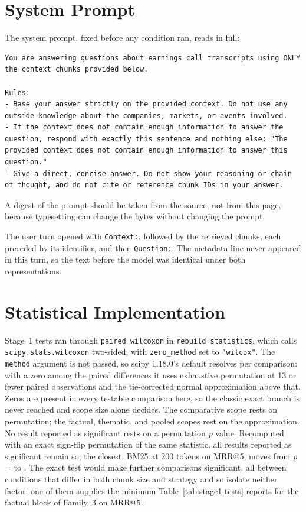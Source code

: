 \section{System Prompt}

The system prompt, fixed before any condition ran, reads in full:

\begin{lstlisting}[breaklines=true]
You are answering questions about earnings call transcripts using ONLY the context chunks provided below.

Rules:
- Base your answer strictly on the provided context. Do not use any outside knowledge about the companies, markets, or events involved.
- If the context does not contain enough information to answer the question, respond with exactly this sentence and nothing else: "The provided context does not contain enough information to answer this question."
- Give a direct, concise answer. Do not show your reasoning or chain of thought, and do not cite or reference chunk IDs in your answer.
\end{lstlisting}

A digest of the prompt should be taken from the source, not from this page,
because typesetting can change the bytes without changing the prompt.

The user turn opened with \texttt{Context:}, followed by the retrieved chunks,
each preceded by its identifier, and then \texttt{Question:}. The metadata line
never appeared in this turn, so the text before the model was identical under
both representations.

\section{Statistical Implementation}

Stage~1 tests ran through \texttt{paired\_wilcoxon} in
\texttt{rebuild\_statistics}, which calls
\texttt{scipy.stats.\allowbreak{}wilcoxon} two-sided, with
\texttt{zero\_method} set to \texttt{"wilcox"}. The
\texttt{method} argument is not passed, so scipy 1.18.0's default resolves per
comparison: with a zero among the paired differences it uses exhaustive
permutation at 13 or fewer paired observations and the tie-corrected normal
approximation above that. Zeros are present in every testable comparison here,
so the classic exact branch is never reached and scope size alone decides. The
comparative scope rests on permutation; the factual, thematic, and pooled scopes
rest on the approximation. No result reported as significant rests on a
permutation \emph{p} value. Recomputed with an exact sign-flip permutation of the
same statistic, all \thesisExactNumSigReported{} results reported as significant
remain so; the closest, BM25 at 200 tokens on MRR@5, moves from \emph{p} =
\thesisExactBmSmallMrrHolmReported{} to \thesisExactBmSmallMrrHolmExact{}. The
exact test would make \thesisExactNumSigGained{} further comparisons significant,
all between conditions that differ in both chunk size and strategy and so
isolate neither factor; one of them supplies the minimum
Table~\ref{tab:stage1-tests} reports for the factual block of Family~3 on
MRR@5.

